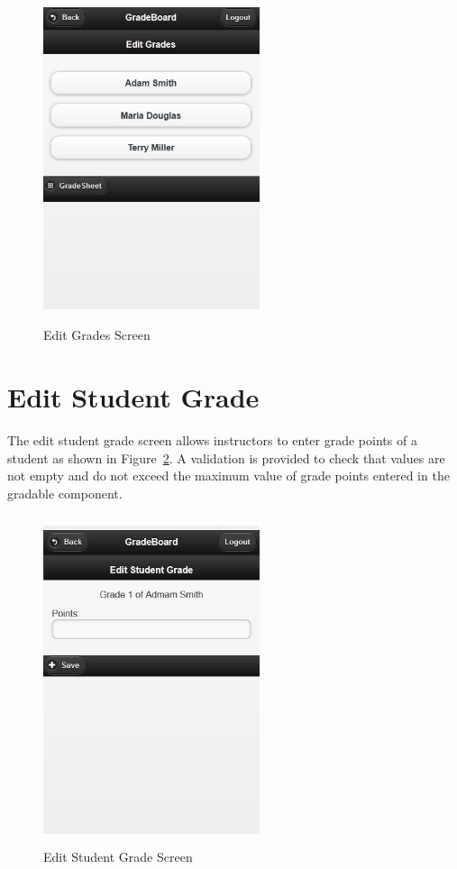 \vspace{3em}
\begin{figure}[H]
\begin{center}
\includegraphics[height=3.8in,width=2.5in]{images/editgrades_screen.jpg}
\caption{Edit Grades Screen}
\label{fig:editgrades_screen}
\end{center}
\end{figure}

\newpage
\section{Edit Student Grade}
The edit student grade screen allows instructors to enter grade points of a student as shown in Figure~\ref{fig:editstudentgrade_screen}. A validation is provided to check that values are not empty and do not exceed the maximum value of grade points entered in the gradable component.

\vspace{3em}
\begin{figure}[H]
\begin{center}
\includegraphics[height=3.8in,width=2.5in]{images/editstudentgrade_screen.jpg}
\caption{Edit Student Grade Screen}
\label{fig:editstudentgrade_screen}
\end{center}
\end{figure}


